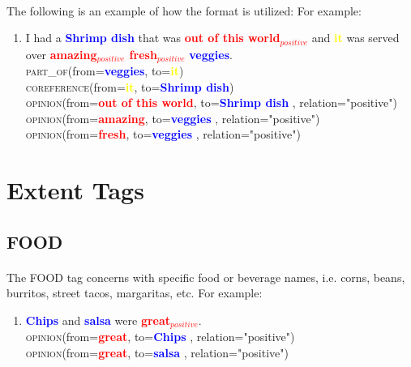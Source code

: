 \documentclass{article}
\begin{document}
\paragraph{}
The following is an example of how the format is utilized:
For example:
\begin{enumerate}
\item I had a \textbf{\textcolor{blue}{Shrimp dish}} that was \textbf{\textcolor{red}{out of this world$_{positive}$}} and \textbf{\textcolor{yellow}{it}} was served over \textbf{\textcolor{red}{amazing$_{positive}$ fresh$_{positive}$}} \textbf{\textcolor{blue}{veggies}}. \\
\textsc{part\_of}(from=\textbf{\textcolor{blue}{veggies}}, to=\textbf{\textcolor{yellow}{it}}) \\
\textsc{coreference}(from=\textbf{\textcolor{yellow}{it}}, to=\textbf{\textcolor{blue}{Shrimp dish}})\\
\textsc{opinion}(from=\textbf{\textcolor{red}{out of this world}}, to=\textbf{\textcolor{blue}{Shrimp dish}} , relation="positive")\\
\textsc{opinion}(from=\textbf{\textcolor{red}{amazing}}, to=\textbf{\textcolor{blue}{veggies}} , relation="positive")\\
\textsc{opinion}(from=\textbf{\textcolor{red}{fresh}}, to=\textbf{\textcolor{blue}{veggies}} , relation="positive")
\end{enumerate}

\newpage
\section{Extent Tags}

\subsection{FOOD}
\paragraph{}
The FOOD tag concerns with specific food or beverage names, i.e. corns, beans, burritos, street tacos, margaritas, etc. For example:
\begin{enumerate}[resume]
\item \textbf{\textcolor{blue}{Chips}} and \textbf{\textcolor{blue}{salsa}} were \textbf{\textcolor{red}{great$_{positive}$}}.\\
\textsc{opinion}(from=\textbf{\textcolor{red}{great}}, to=\textbf{\textcolor{blue}{Chips}} , relation="positive")\\
\textsc{opinion}(from=\textbf{\textcolor{red}{great}}, to=\textbf{\textcolor{blue}{salsa}} , relation="positive")
\end{enumerate}
\end{document}
